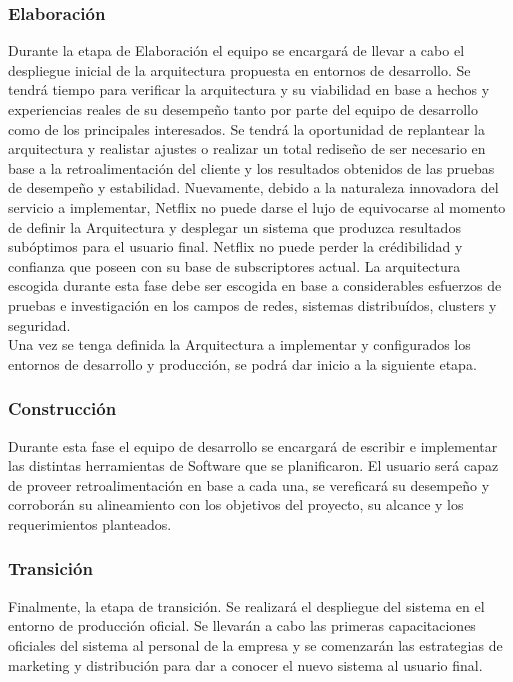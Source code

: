 \documentclass{article}
\begin{document}
\subsubsection{Elaboración}
Durante la etapa de Elaboración el equipo se encargará de 
llevar a cabo el despliegue inicial de la arquitectura propuesta en 
entornos de desarrollo. Se tendrá tiempo para verificar la 
arquitectura y su viabilidad en base a hechos y experiencias reales
de su desempeño tanto por parte del equipo de desarrollo como 
de los principales interesados. Se tendrá la oportunidad de replantear
la arquitectura y realistar ajustes o realizar un total rediseño
de ser necesario en base a la retroalimentación del cliente y los
resultados obtenidos de las pruebas de desempeño y estabilidad.
Nuevamente, debido a la naturaleza innovadora del servicio a
implementar, Netflix no puede darse el lujo de equivocarse al momento
de definir la Arquitectura y desplegar un sistema que produzca
resultados subóptimos para el usuario final. Netflix no puede perder
la crédibilidad y confianza que poseen con su base de subscriptores
actual. La arquitectura escogida durante esta fase debe ser escogida
en base a considerables esfuerzos de pruebas e investigación en los
campos de redes, sistemas distribuídos, clusters y seguridad.
\\
Una vez se tenga definida la Arquitectura a implementar y configurados
los entornos de desarrollo y producción, se podrá dar inicio a la 
siguiente etapa.
\subsubsection{Construcción}
Durante esta fase el equipo de desarrollo
se encargará de escribir e implementar las distintas herramientas
de Software que se planificaron. El usuario será capaz de proveer
retroalimentación en base a cada una, se vereficará su desempeño
y corroborán su alineamiento con los objetivos del proyecto, 
su alcance y los requerimientos planteados.
\subsubsection{Transición}
Finalmente, la etapa de transición. Se realizará el despliegue del
sistema en el entorno de producción oficial. Se llevarán a cabo las
primeras capacitaciones oficiales del sistema al personal de la
empresa y se comenzarán las estrategias de marketing y distribución
para dar a conocer el nuevo sistema al usuario final.
\end{document}
